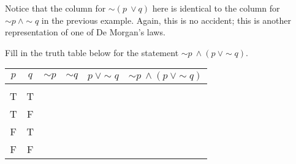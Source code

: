 Notice that the column for $\sim (p\ \vee q)$ here is identical to the column for $\sim p\ \wedge \sim q$ in the previous example.  Again, this is no accident; this is another representation of one of De Morgan's laws.
\vfill

\begin{try}
Fill in the truth table below for the statement $\sim p\ \wedge (p\ \vee \sim q)$.
\begin{center}
\begin{tabular}{|c c c c c c|}
\hline
$p$ & $q$ & $\sim p$ & $\sim q$ & $p\ \vee \sim q$ & $\sim p\ \wedge (p\ \vee \sim q)$\\
\hline
& & & & &\\
T & T & & & &\\
T & F & & & &\\
F & T & & & &\\
F & F & & & &\\
\hline
\end{tabular}
\end{center}
\end{try}
\vfill
\text{}
\vfill
\text{}
\vfill
\pagebreak

